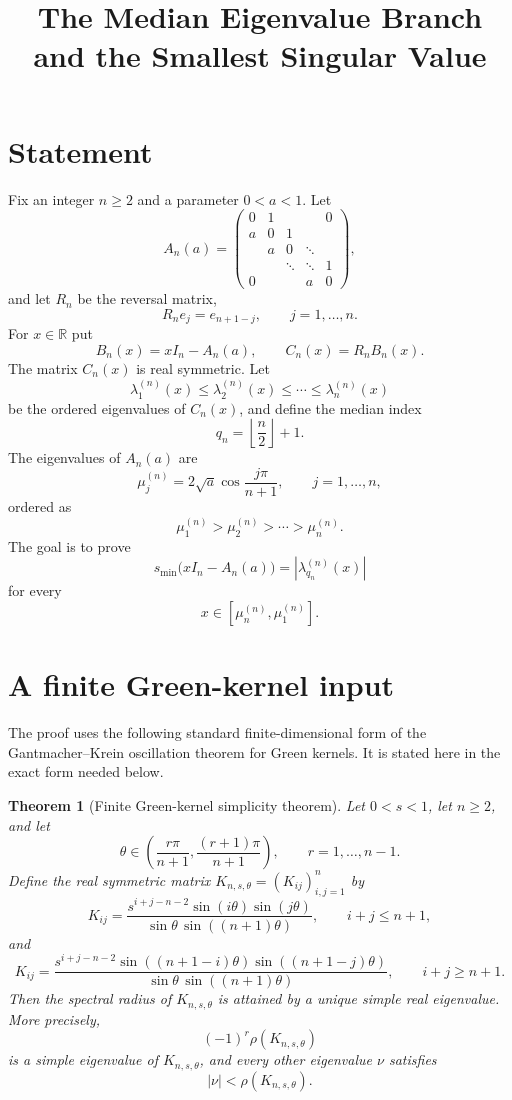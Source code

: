 \documentclass[11pt]{article}
\newtheorem{theorem}{Theorem}
\begin{document}
\title{The Median Eigenvalue Branch and the Smallest Singular Value}
\author{}
\date{}
\maketitle

\section*{Statement}

Fix an integer $n\geq 2$ and a parameter $0<a<1$.  Let
\[
A_n(a)=
\begin{pmatrix}
0&1&&&0\\
a&0&1&&\\
& a&0&\ddots&\\
&&\ddots&\ddots&1\\
0&&&a&0
\end{pmatrix},
\]
and let $R_n$ be the reversal matrix,
\[
R_n e_j=e_{n+1-j},\qquad j=1,\ldots,n.
\]
For $x\in\mathbb R$ put
\[
B_n(x)=xI_n-A_n(a),\qquad C_n(x)=R_nB_n(x).
\]
The matrix $C_n(x)$ is real symmetric.  Let
\[
\lambda_1^{(n)}(x)\leq \lambda_2^{(n)}(x)\leq \cdots\leq \lambda_n^{(n)}(x)
\]
be the ordered eigenvalues of $C_n(x)$, and define the median index
\[
q_n=\left\lfloor\frac n2\right\rfloor+1.
\]
The eigenvalues of $A_n(a)$ are
\[
\mu_j^{(n)}=2\sqrt a\cos\frac{j\pi}{n+1},\qquad j=1,\ldots,n,
\]
ordered as
\[
\mu_1^{(n)}>\mu_2^{(n)}>\cdots>\mu_n^{(n)}.
\]
The goal is to prove
\[
\boxed{
 s_{\min}\bigl(xI_n-A_n(a)\bigr)
 =
 \left|\lambda_{q_n}^{(n)}(x)\right|
 }
\]
for every
\[
x\in[\mu_n^{(n)},\mu_1^{(n)}].
\]

\section*{A finite Green-kernel input}

The proof uses the following standard finite-dimensional form of the
Gantmacher--Krein oscillation theorem for Green kernels.  It is stated here
in the exact form needed below.

\begin{theorem}[Finite Green-kernel simplicity theorem]\label{thm:GK}
Let $0<s<1$, let $n\geq 2$, and let
\[
\theta\in\left(\frac{r\pi}{n+1},\frac{(r+1)\pi}{n+1}\right),
\qquad r=1,\ldots,n-1.
\]
Define the real symmetric matrix $K_{n,s,\theta}=(K_{ij})_{i,j=1}^n$ by
\[
K_{ij}
=
\frac{
 s^{i+j-n-2}\sin(i\theta)\sin(j\theta)
}{
 \sin\theta\,\sin((n+1)\theta)
},
\qquad i+j\leq n+1,
\]
and
\[
K_{ij}
=
\frac{
 s^{i+j-n-2}\sin((n+1-i)\theta)\sin((n+1-j)\theta)
}{
 \sin\theta\,\sin((n+1)\theta)
},
\qquad i+j\geq n+1.
\]
Then the spectral radius of $K_{n,s,\theta}$ is attained by a unique simple
real eigenvalue.  More precisely,
\[
(-1)^r\rho(K_{n,s,\theta})
\]
is a simple eigenvalue of $K_{n,s,\theta}$, and every other eigenvalue $\nu$
satisfies
\[
|\nu|<\rho(K_{n,s,\theta}).
\]
\end{theorem}
\end{document}
